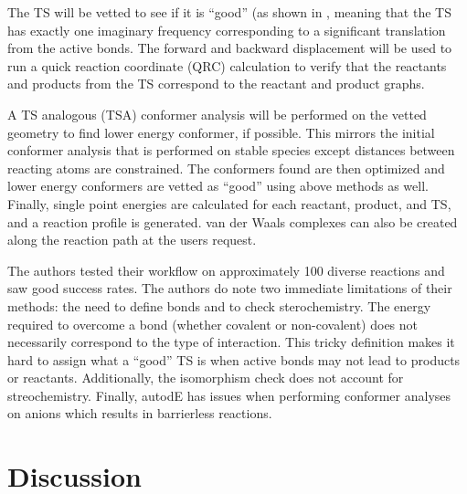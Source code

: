 \documentclass[preprint, 11pt]{elsarticle} %
\begin{document}
The TS will be vetted to see if it is ``good'' (as shown in , meaning that the TS has exactly one imaginary frequency corresponding to a significant translation from the active bonds.
The forward and backward displacement will be used to run a quick reaction coordinate (QRC) calculation \cite{qrc:2003} to verify that the reactants and products from the TS correspond to the reactant and product graphs.

A TS analogous (TSA) conformer analysis will be performed on the vetted geometry to find lower energy conformer, if possible.
This mirrors the initial conformer analysis that is performed on stable species except distances between reacting atoms are constrained.
The conformers found are then optimized and lower energy conformers are vetted as ``good'' using above methods as well.
Finally, single point energies are calculated for each reactant, product, and TS, and a reaction profile is generated. 
van der Waals complexes can also be created along the reaction path at the users request.

The authors tested their workflow on approximately 100 diverse reactions and saw good success rates. 
The authors do note two immediate limitations of their methods: the need to define bonds and to check sterochemistry. 
The energy required to overcome a bond (whether covalent or non-covalent) does not necessarily correspond to the type of interaction. 
This tricky definition makes it hard to assign what a ``good'' TS is when active bonds may not lead to products or reactants. 
Additionally, the isomorphism check does not account for streochemistry.
Finally, autodE has issues when performing conformer analyses on anions which results in barrierless reactions. 






\section{Discussion}
%
\end{document}
